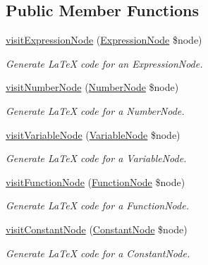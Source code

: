 \subsection*{Public Member Functions}
\begin{DoxyCompactItemize}
\item 
\hyperlink{classMathParser_1_1Interpreting_1_1LaTeXPrinter_a68bcaa8f65dbebd8aadd6002b50dea49}{visit\-Expression\-Node} (\hyperlink{classMathParser_1_1Parsing_1_1Nodes_1_1ExpressionNode}{Expression\-Node} \$node)
\begin{DoxyCompactList}\small\item\em Generate La\-Te\-X code for an Expression\-Node. \end{DoxyCompactList}\item 
\hyperlink{classMathParser_1_1Interpreting_1_1LaTeXPrinter_a5bbb40a11601dc347c9d4ec629723396}{visit\-Number\-Node} (\hyperlink{classMathParser_1_1Parsing_1_1Nodes_1_1NumberNode}{Number\-Node} \$node)
\begin{DoxyCompactList}\small\item\em Generate La\-Te\-X code for a Number\-Node. \end{DoxyCompactList}\item 
\hyperlink{classMathParser_1_1Interpreting_1_1LaTeXPrinter_aced38823c7de0b9ad84884028370a8d2}{visit\-Variable\-Node} (\hyperlink{classMathParser_1_1Parsing_1_1Nodes_1_1VariableNode}{Variable\-Node} \$node)
\begin{DoxyCompactList}\small\item\em Generate La\-Te\-X code for a Variable\-Node. \end{DoxyCompactList}\item 
\hyperlink{classMathParser_1_1Interpreting_1_1LaTeXPrinter_a85eb667103f7b04abfe3c83e6c0e24a2}{visit\-Function\-Node} (\hyperlink{classMathParser_1_1Parsing_1_1Nodes_1_1FunctionNode}{Function\-Node} \$node)
\begin{DoxyCompactList}\small\item\em Generate La\-Te\-X code for a Function\-Node. \end{DoxyCompactList}\item 
\hyperlink{classMathParser_1_1Interpreting_1_1LaTeXPrinter_aaa2c3cfcfa01461f52a8f656ef52b92c}{visit\-Constant\-Node} (\hyperlink{classMathParser_1_1Parsing_1_1Nodes_1_1ConstantNode}{Constant\-Node} \$node)
\begin{DoxyCompactList}\small\item\em Generate La\-Te\-X code for a Constant\-Node. \end{DoxyCompactList}\item 

\end{DoxyCompactItemize}

